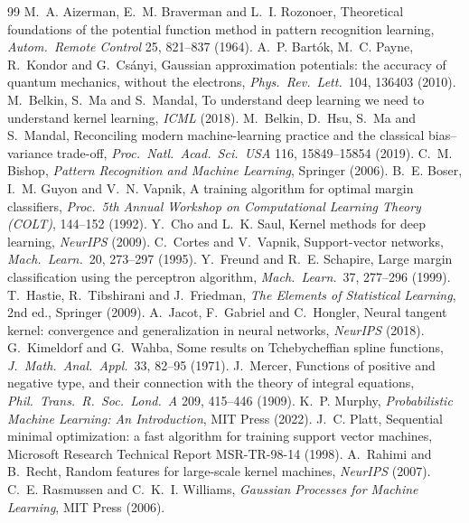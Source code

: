 \documentclass[11pt]{article}
\begin{document}
\begin{thebibliography}{99}\small
{} M.~A. Aizerman, E.~M. Braverman and L.~I. Rozonoer, Theoretical foundations of the potential function method in pattern recognition learning, \emph{Autom.\ Remote Control} 25, 821--837 (1964).
 A.~P. Bart\'ok, M.~C. Payne, R.~Kondor and G.~Cs\'anyi, Gaussian approximation potentials: the accuracy of quantum mechanics, without the electrons, \emph{Phys.\ Rev.\ Lett.}\ 104, 136403 (2010).
 M.~Belkin, S.~Ma and S.~Mandal, To understand deep learning we need to understand kernel learning, \emph{ICML} (2018).
 M.~Belkin, D.~Hsu, S.~Ma and S.~Mandal, Reconciling modern machine-learning practice and the classical bias--variance trade-off, \emph{Proc.\ Natl.\ Acad.\ Sci.\ USA} 116, 15849--15854 (2019).
 C.~M. Bishop, \emph{Pattern Recognition and Machine Learning}, Springer (2006).
 B.~E. Boser, I.~M. Guyon and V.~N. Vapnik, A training algorithm for optimal margin classifiers, \emph{Proc.\ 5th Annual Workshop on Computational Learning Theory (COLT)}, 144--152 (1992).
 Y.~Cho and L.~K. Saul, Kernel methods for deep learning, \emph{NeurIPS} (2009).
 C.~Cortes and V.~Vapnik, Support-vector networks, \emph{Mach.\ Learn.}\ 20, 273--297 (1995).
 Y.~Freund and R.~E. Schapire, Large margin classification using the perceptron algorithm, \emph{Mach.\ Learn.}\ 37, 277--296 (1999).
 T.~Hastie, R.~Tibshirani and J.~Friedman, \emph{The Elements of Statistical Learning}, 2nd ed., Springer (2009).
 A.~Jacot, F.~Gabriel and C.~Hongler, Neural tangent kernel: convergence and generalization in neural networks, \emph{NeurIPS} (2018).
 G.~Kimeldorf and G.~Wahba, Some results on Tchebycheffian spline functions, \emph{J.\ Math.\ Anal.\ Appl.}\ 33, 82--95 (1971).
 J.~Mercer, Functions of positive and negative type, and their connection with the theory of integral equations, \emph{Phil.\ Trans.\ R.\ Soc.\ Lond.\ A} 209, 415--446 (1909).
 K.~P. Murphy, \emph{Probabilistic Machine Learning: An Introduction}, MIT Press (2022).
 J.~C. Platt, Sequential minimal optimization: a fast algorithm for training support vector machines, Microsoft Research Technical Report MSR-TR-98-14 (1998).
 A.~Rahimi and B.~Recht, Random features for large-scale kernel machines, \emph{NeurIPS} (2007).
 C.~E. Rasmussen and C.~K.~I. Williams, \emph{Gaussian Processes for Machine Learning}, MIT Press (2006).

\end{thebibliography}
\end{document}

